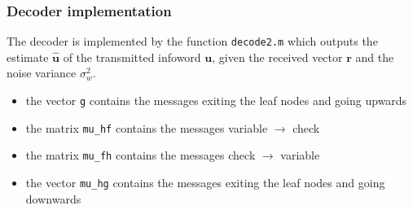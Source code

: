 \documentclass[]{beamer}
\begin{document}
\begin{frame}
\transwipe[direction=0]
\frametitle{Decoder implementation}
The decoder is implemented by the function \texttt{decode2.m} which outputs the estimate $\mathbf{\widehat u}$ of the transmitted infoword $\mathbf u$, given the received vector $\mathbf r$ and the noise variance $\sigma_w^2$.

\begin{itemize}
\item the vector \texttt{g} contains the messages exiting the leaf nodes and going upwards
\item the matrix \texttt{mu\_hf} contains the messages variable $\rightarrow$ check
\item the matrix \texttt{mu\_fh} contains the messages check $\rightarrow$ variable
\item the vector \texttt{mu\_hg} contains the messages exiting the leaf nodes and going downwards
\end{itemize}




\end{frame}




\end{document}
